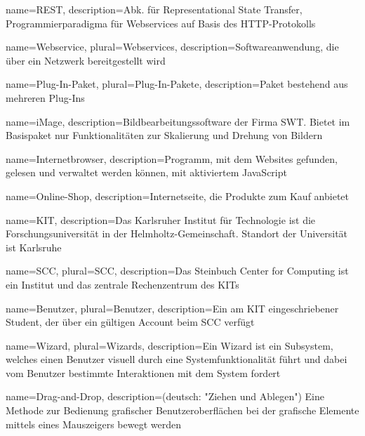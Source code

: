 %
%
%
%
{
	name=REST,
	description={Abk. für Representational State Transfer, Programmierparadigma für \glspl{Webservice} auf Basis des HTTP-Protokolls}
}

{
	name=Webservice,
	plural=Webservices,
	description={Softwareanwendung, die über ein Netzwerk bereitgestellt wird}
}

{
	name=Plug-In-Paket,
	plural=Plug-In-Pakete,
	description={Paket bestehend aus mehreren \glspl{Plug-In}}
}

{
	name={iMage},
	description={Bildbearbeitungssoftware der Firma SWT. Bietet im Basispaket nur Funktionalitäten zur Skalierung und Drehung von Bildern}
}

{
	name={Internetbrowser},
	description={Programm, mit dem Websites gefunden, gelesen und verwaltet werden können, mit aktiviertem JavaScript}
}

{
	name={Online-Shop},
	description={Internetseite, die Produkte zum Kauf anbietet}
}

{
	name=KIT,
	description={Das Karlsruher Institut für Technologie ist die Forschungsuniversität in der Helmholtz-Gemeinschaft. Standort der Universität ist Karlsruhe }
}

{
	name=SCC,
	plural=SCC,
	description={Das Steinbuch Center for Computing ist ein Institut und das zentrale Rechenzentrum des \gls{KIT}s}
}

{
	name=Benutzer,
	plural=Benutzer,
	description={Ein am \gls{KIT} eingeschriebener Student, der über ein gültigen Account beim \gls{SCC} verfügt}
}

{
	name=Wizard,
	plural=Wizards,
	description={Ein Wizard ist ein Subsystem, welches einen \gls{Benutzer} visuell durch eine Systemfunktionalität führt und dabei vom \gls{Benutzer} bestimmte Interaktionen mit dem System fordert}
}

{
	name=Drag-and-Drop,
	description={(deutsch: "Ziehen und Ablegen") Eine Methode zur Bedienung grafischer Benutzeroberflächen bei der grafische Elemente mittels eines Mauszeigers bewegt werden}
}

